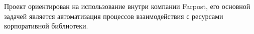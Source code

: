 \documentclass['../main.tex']{subfiles}
\begin{document}
    \par
    Проект ориентирован на использование внутри компании Farpost, его основной задачей является автоматизация процессов взаимодействия с ресурсами корпоративной библиотеки.
    \clearpage
\end{document}
